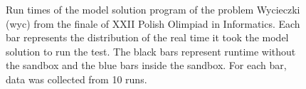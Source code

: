 \documentclass[en]{pracamgr}
\begin{document}
\begin{appendices}
\begin{figure}[H]
\caption{Run times of the model solution program of the problem Wycieczki (wyc) from the finale of XXII Polish Olimpiad in Informatics. Each bar represents the distribution of the real time it took the model solution to run the test. The black bars represent runtime without the sandbox and the blue bars inside the sandbox. For each bar, data was collected from 10 runs.}
\label{figure:wyc_model_solution_real_time}
\end{figure}


\end{appendices}
\end{document}
